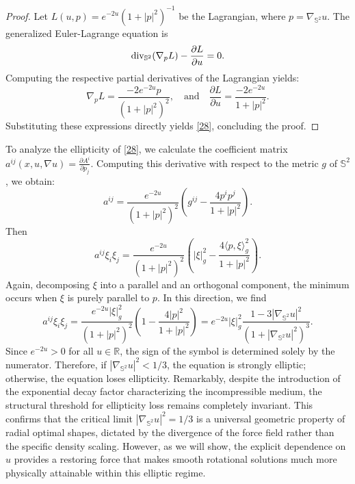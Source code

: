 \documentclass[a4paper,12pt]{amsart}
\theoremstyle{plain}
\theoremstyle{definition}
\begin{document}
\begin{proof}
Let $L(u, p) = e^{-2u}(1 + |p|^2)^{-1}$ be the Lagrangian, where $p = \nabla_{\mathbb{S}^2} u$. The generalized Euler-Lagrange equation is
\begin{equation*}
 {\rm div}_{\mathbb{S}^2} (\nabla_p L) - \frac{\partial L}{\partial u} = 0.
\end{equation*}
Computing the respective partial derivatives of the Lagrangian yields:
\begin{equation*}
 \nabla_p L = \frac{-2 e^{-2u} p}{(1 + |p|^2)^2}, \quad \text{and} \quad \frac{\partial L}{\partial u} = \frac{-2 e^{-2u}}{1 + |p|^2}.
\end{equation*}
Substituting these expressions directly yields \eqref{28}, concluding the proof.
\end{proof}
To analyze the ellipticity of \eqref{28}, we calculate the coefficient matrix $a^{ij}(x, u, \nabla u) = \frac{\partial A^i}{\partial p_j}$. Computing this derivative with respect to the metric $g$ of $\mathbb{S}^2$, we obtain:
$$
 a^{ij} = \frac{e^{-2u}}{(1+|p|^2)^2} \left( g^{ij} - \frac{4 p^i p^j}{1+|p|^2} \right).
$$
Then
$$
 a^{ij} \xi_i \xi_j = \frac{e^{-2u}}{(1+|p|^2)^2} \left( |\xi|^2_g - \frac{4 \langle p, \xi \rangle_g^2}{1+|p|^2} \right).
$$
Again, decomposing $\xi$ into a parallel and an orthogonal component, the minimum occurs when $\xi$ is purely parallel to $p$. In this direction, we find
$$
 a^{ij} \xi_i \xi_j = \frac{e^{-2u} |\xi|^2_g}{(1+|p|^2)^2} \left( 1 - \frac{4|p|^2}{1+|p|^2} \right) = e^{-2u} |\xi|^2_g \frac{1 - 3|\nabla_{\mathbb{S}^2} u|^2}{(1+|\nabla_{\mathbb{S}^2} u|^2)^3}.
$$
Since $e^{-2u} > 0$ for all $u \in \mathbb{R}$, the sign of the symbol is determined solely by the numerator. Therefore, if $|\nabla_{\mathbb{S}^2} u|^2 < 1/3$, the equation is strongly elliptic; otherwise, the equation loses ellipticity. Remarkably, despite the introduction of the exponential decay factor characterizing the incompressible medium, the structural threshold for ellipticity loss remains completely invariant. This confirms that the critical limit $|\nabla_{\mathbb{S}^2} u|^2= 1/3$ is a universal geometric property of radial optimal shapes, dictated by the divergence of the force field rather than the specific density scaling. However, as we will show, the explicit dependence on $u$ provides a restoring force that makes smooth rotational solutions much more physically attainable within this elliptic regime.

\end{document}
